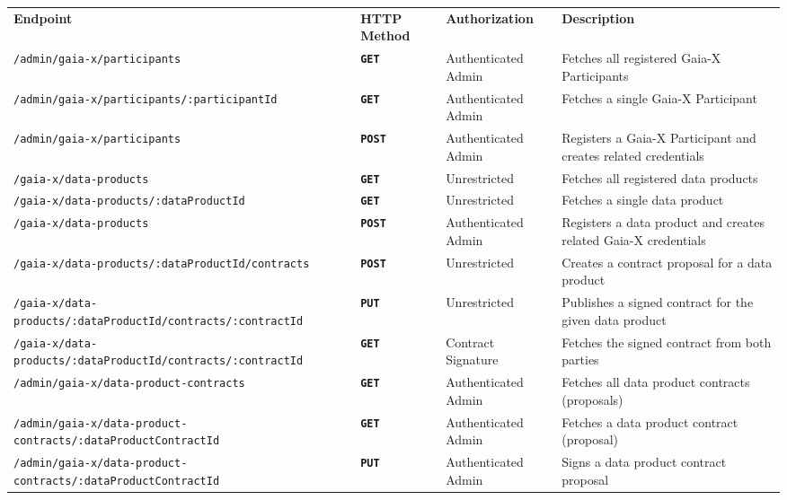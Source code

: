 \begin{longtable}{ |p{4cm}|p{2cm}|p{2cm}|p{7cm}| }
    \hhline{----}
    \textbf{Endpoint} & \textbf{HTTP Method} & \textbf{Authorization} & \textbf{Description}\\
    \hhline{----}
    \texttt{/admin/gaia-x/participants} & \textbf{\texttt{GET}} & Authenticated Admin & Fetches all registered Gaia-X Participants\\
    \hhline{----}
    \texttt{/admin/gaia-x/participants/:participantId} & \textbf{\texttt{GET}} & Authenticated Admin & Fetches a single Gaia-X Participant\\
    \hhline{----}
    \texttt{/admin/gaia-x/participants} & \textbf{\texttt{POST}} & Authenticated Admin & Registers a Gaia-X Participant and creates related credentials\\
    \hhline{----}
    \texttt{/gaia-x/data-products} & \textbf{\texttt{GET}} & Unrestricted & Fetches all registered data products\\
    \hhline{----}
    \texttt{/gaia-x/data-products/:dataProductId} & \textbf{\texttt{GET}} & Unrestricted & Fetches a single data product\\
    \hhline{----}
    \texttt{/gaia-x/data-products} & \textbf{\texttt{POST}} & Authenticated Admin & Registers a data product and creates related Gaia-X credentials\\
    \hhline{----}
    \texttt{/gaia-x/data-products/:dataProductId/contracts} & \textbf{\texttt{POST}} & Unrestricted & Creates a contract proposal for a data product\\
    \hhline{----}
    \texttt{/gaia-x/data-products/:dataProductId/contracts/:contractId} & \textbf{\texttt{PUT}} & Unrestricted & Publishes a signed contract for the given data product\\
    \hhline{----}
    \texttt{/gaia-x/data-products/:dataProductId/contracts/:contractId} & \textbf{\texttt{GET}} & Contract Signature & Fetches the signed contract from both parties\\
    \hhline{----}
    \texttt{/admin/gaia-x/data-product-contracts} & \textbf{\texttt{GET}} & Authenticated Admin & Fetches all data product contracts (proposals)\\
    \hhline{----}
    \texttt{/admin/gaia-x/data-product-contracts/:dataProductContractId} & \textbf{\texttt{GET}} & Authenticated Admin & Fetches a data product contract (proposal)\\
    \hhline{----}
    \texttt{/admin/gaia-x/data-product-contracts/:dataProductContractId} & \textbf{\texttt{PUT}} & Authenticated Admin & Signs a data product contract proposal\\

\end{longtable}

